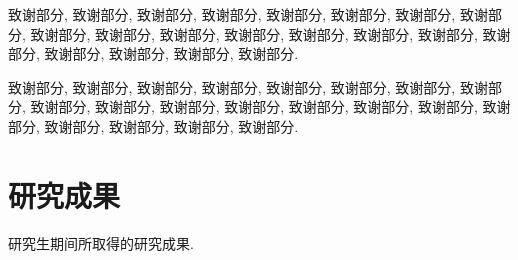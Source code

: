 \documentclass{ecnumaster}
\begin{document}
致谢部分, 致谢部分, 致谢部分, 致谢部分, 致谢部分,
致谢部分, 致谢部分, 致谢部分, 致谢部分, 致谢部分,
致谢部分, 致谢部分, 致谢部分, 致谢部分, 致谢部分,
致谢部分, 致谢部分, 致谢部分, 致谢部分, 致谢部分.

致谢部分, 致谢部分, 致谢部分, 致谢部分, 致谢部分,
致谢部分, 致谢部分, 致谢部分, 致谢部分, 致谢部分,
致谢部分, 致谢部分, 致谢部分, 致谢部分, 致谢部分,
致谢部分, 致谢部分, 致谢部分, 致谢部分, 致谢部分.

\clearpage{\pagestyle{empty}\cleardoublepage}
\chapter*{研究成果}

研究生期间所取得的研究成果.
\end{document}
